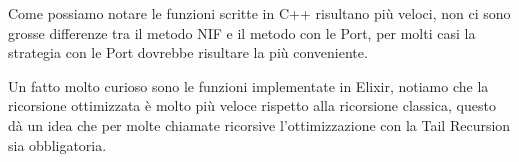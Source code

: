 Come possiamo notare le funzioni scritte in C++ risultano più veloci,
non ci sono grosse differenze tra il metodo NIF e il metodo con le Port,
per molti casi la strategia con le Port dovrebbe risultare la più conveniente.

Un fatto molto curioso sono le funzioni implementate in Elixir,
notiamo che la ricorsione ottimizzata è molto più veloce rispetto
alla ricorsione classica, questo dà un idea che per molte chiamate ricorsive
l'ottimizzazione con la Tail Recursion sia obbligatoria.
